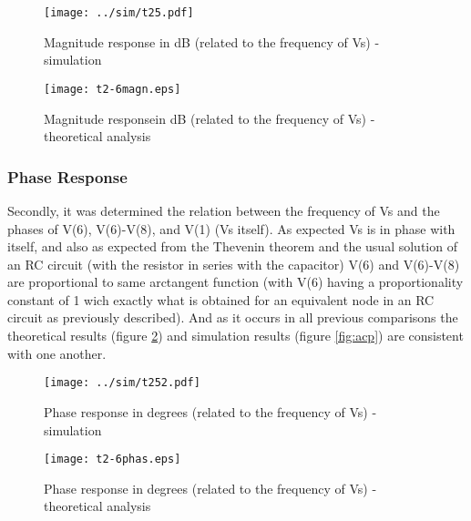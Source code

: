 \begin{figure}[h] \centering
  \begin{minipage}{.5\textwidth}
    \texttt{[image: ../sim/t25.pdf]}
    \caption{Magnitude response in dB (related to the frequency of Vs) - simulation}
    \label{fig:acm}
    \end{minipage}%
  \begin{minipage}{.5\textwidth}
  \centering
    \texttt{[image: t2-6magn.eps]}
    \caption{Magnitude responsein dB (related to the frequency of Vs) - theoretical analysis }
    \label{fig:compmagn}
      \end{minipage}%
\end{figure}

\newpage
\subsubsection{Phase Response}

Secondly, it was determined the relation between the frequency of Vs and the phases of V(6), V(6)-V(8), and V(1) (Vs itself). As expected Vs is in phase with itself, and also as expected from the Thevenin theorem and the usual solution of an RC circuit (with the resistor in series with the capacitor) V(6) and V(6)-V(8) are proportional to same arctangent function (with V(6) having a proportionality constant of 1 wich exactly what is obtained for an equivalent node in an RC circuit as previously described). And as it occurs in all previous comparisons the theoretical results (figure \ref{fig:comphas}) and simulation results (figure \ref{fig:acp}) are consistent with one another.

\begin{figure}[h] \centering
  \begin{minipage}{.5\textwidth}
    \texttt{[image: ../sim/t252.pdf]}
    \caption{Phase response in degrees (related to the frequency of Vs) - simulation}
    \label{fig:acp}
    \end{minipage}%
  \begin{minipage}{.5\textwidth}
  \centering
    \texttt{[image: t2-6phas.eps]}
    \caption{Phase response in degrees (related to the frequency of Vs) - theoretical analysis}
    \label{fig:comphas}
      \end{minipage}%
\end{figure}

\newpage




